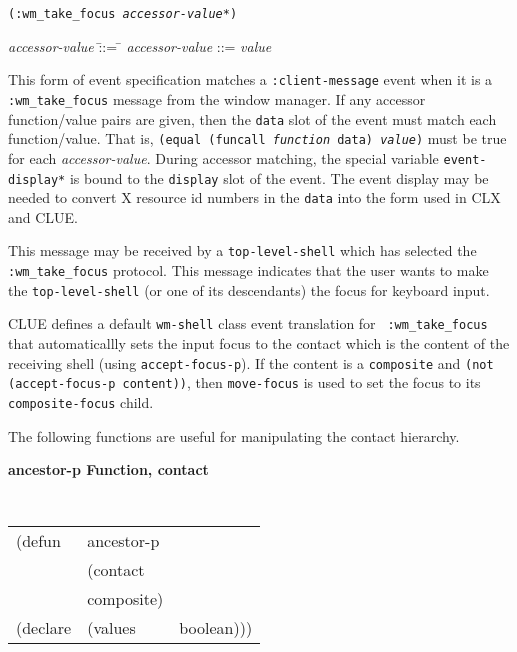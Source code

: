 {\samepage
{}
{\tt (:wm\_take\_focus {\em accessor-value}*)}\\
\hspace*{.75in}
\parbox[t]{5.75in}{
\begin{tabbing}
{\em accessor-value} \= ::= \= \kill
{\em accessor-value} \>::=  {\em value} \\
\end{tabbing}}
}
\begin{flushright}
\parbox[t]{5.75in}{
This
form of event specification matches a {\tt :client-message}
event when it is a {\tt :wm\_take\_focus} message from the window manager.
If
any accessor function/value pairs are
given, then the {\tt data} slot of the event must
match each function/value. That is, {\tt (equal (funcall {\em function}
data) {\em value})} must be true for each {\em accessor-value}.
During accessor matching, the special variable {\tt *event-display*} is
bound to the {\tt display} slot of the event. The event display may be
needed to convert X resource id numbers in the {\tt data} into the form
used in CLX and CLUE.}

\parbox[t]{5.75in}{
This message may be received by a {\tt top-level-shell} which has selected the 
{\tt :wm\_take\_focus} protocol. This message indicates that the user wants to make
the {\tt top-level-shell} (or one of its descendants) the focus for keyboard input.}

\parbox[t]{5.75in}{
CLUE defines a default {\tt wm-shell} class event translation for {\tt
:wm\_take\_focus} that automaticallly sets the input focus to the contact which
is the content of the receiving shell
(using {\tt accept-focus-p}).
If the content is a {\tt composite} and {\tt (not (accept-focus-p content))},
then {\tt move-focus} is used to set the focus to its
{\tt composite-focus} child.
}\end{flushright}

The following functions are useful for manipulating the contact
hierarchy.

{\samepage
{\large {\bf ancestor-p \hfill Function, contact}} 
\begin{flushright} \parbox[t]{6.125in}{
\tt
\begin{tabular}{lll}
\raggedright
(defun & ancestor-p & \\ 
& (contact\\
&  composite) \\
(declare &(values  & boolean)))
\end{tabular}
\rm

}\end{flushright}}

